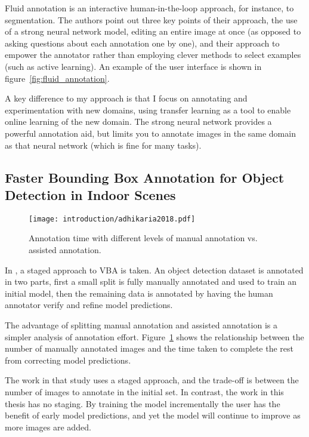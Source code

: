 Fluid annotation is an interactive human-in-the-loop approach, for instance, to segmentation. The authors point out three key points of their approach, the use of a strong neural network model, editing an entire image at once (as opposed to asking questions about each annotation one by one), and their approach to empower the annotator rather than employing clever methods to select examples (such as active learning). An example of the user interface is shown in figure~\ref{fig:fluid_annotation}.

A key difference to my approach is that I focus on annotating and experimentation with new domains, using transfer learning as a tool to enable online learning of the new domain. The strong neural network provides a powerful annotation aid, but limits you to annotate images in the same domain as that neural network (which is fine for many tasks).

\subsection{Faster Bounding Box Annotation for Object Detection in Indoor Scenes}

\begin{figure}[h]
  \centering
  \texttt{[image: introduction/adhikaria2018.pdf]}
  \caption{Annotation time with different levels of manual annotation vs. assisted annotation. \cite{Adhikaria2018}}  
  \label{fig:adhikaria2018}
\end{figure}

In \cite{Adhikaria2018}, a staged approach to \gls{VBA} is taken. An object detection dataset is annotated in two parts, first a small split is fully manually annotated and used to train an initial model, then the remaining data is annotated by having the human annotator verify and refine model predictions. 


The advantage of splitting manual annotation and assisted annotation is a simpler analysis of annotation effort. Figure~\ref{fig:adhikaria2018} shows the relationship between the number of manually annotated images and the time taken to complete the rest from correcting model predictions.

The work in that study uses a staged approach, and the trade-off is between the number of images to annotate in the initial set. In contrast, the work in this thesis has no staging. By training the model incrementally the user has the benefit of early model predictions, and yet the model will continue to improve as more images are added.

